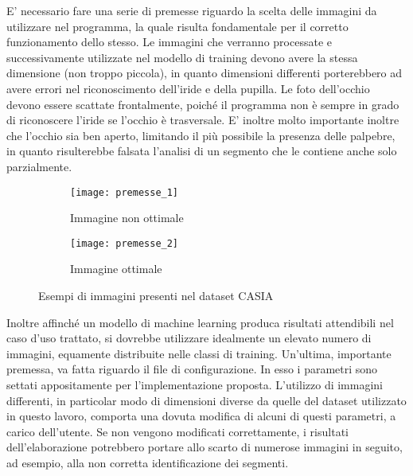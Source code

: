E’ necessario fare una serie di premesse riguardo la scelta delle immagini da utilizzare nel programma, la quale risulta fondamentale per il corretto funzionamento dello stesso. Le immagini che verranno processate e successivamente utilizzate nel modello di training devono avere la stessa dimensione (non troppo piccola), in quanto dimensioni differenti porterebbero ad avere errori nel riconoscimento dell’iride e della pupilla. Le foto dell’occhio devono essere scattate frontalmente, poiché il programma non è sempre in grado di riconoscere l’iride se l’occhio è trasversale. E’ inoltre molto importante inoltre che l’occhio sia ben aperto, limitando il più possibile la presenza delle palpebre, in quanto risulterebbe falsata l’analisi di un segmento che le contiene anche solo parzialmente. 

\begin{figure}
  \centering
  \begin{subfigure}[b]{0.4\textwidth}
    \centering
    \texttt{[image: premesse\_1]}
    \caption{Immagine non ottimale}    
  \end{subfigure}
  \hfill
  \begin{subfigure}[b]{0.4\textwidth}
    \centering
    \texttt{[image: premesse\_2]}
    \caption{Immagine ottimale}       
  \end{subfigure}
  \caption{Esempi di immagini presenti nel dataset CASIA}
\end{figure}

Inoltre affinché un modello di machine learning produca risultati attendibili nel caso d’uso trattato, si dovrebbe utilizzare idealmente un elevato numero di immagini, equamente distribuite nelle classi di training. Un’ultima, importante premessa, va fatta riguardo il file di configurazione. In esso i parametri  sono settati appositamente per l’implementazione proposta. L’utilizzo di immagini differenti, in particolar modo di dimensioni diverse da quelle del dataset utilizzato in questo lavoro, comporta una dovuta modifica di alcuni di questi parametri, a carico dell’utente. Se non vengono modificati correttamente, i risultati dell’elaborazione potrebbero portare allo scarto di numerose immagini in seguito, ad esempio,  alla non corretta identificazione dei segmenti.
